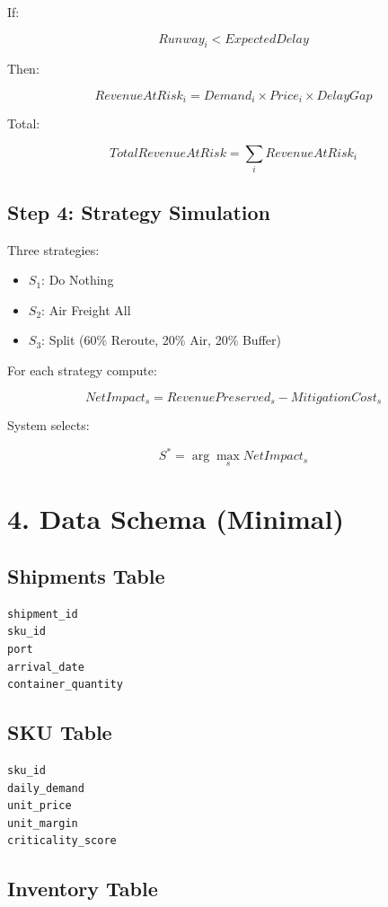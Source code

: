 \documentclass[11pt]{article}
\begin{document}
If:

\[
Runway_i < ExpectedDelay
\]

Then:

\[
RevenueAtRisk_i = Demand_i \times Price_i \times DelayGap
\]

Total:

\[
TotalRevenueAtRisk = \sum_i RevenueAtRisk_i
\]

\subsection*{Step 4: Strategy Simulation}

Three strategies:

\begin{itemize}
    \item $S_1$: Do Nothing
    \item $S_2$: Air Freight All
    \item $S_3$: Split (60\% Reroute, 20\% Air, 20\% Buffer)
\end{itemize}

For each strategy compute:

\[
NetImpact_s = RevenuePreserved_s - MitigationCost_s
\]

System selects:

\[
S^* = \arg\max_s NetImpact_s
\]

\section*{4. Data Schema (Minimal)}

\subsection*{Shipments Table}

\begin{verbatim}
shipment_id
sku_id
port
arrival_date
container_quantity
\end{verbatim}

\subsection*{SKU Table}

\begin{verbatim}
sku_id
daily_demand
unit_price
unit_margin
criticality_score
\end{verbatim}

\subsection*{Inventory Table}
\end{document}
